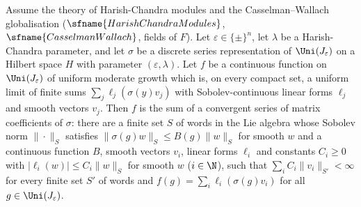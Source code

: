 \begin{theorem}\label{pf:rowprops:closure}
Assume the theory of Harish-Chandra modules and the Casselman--Wallach globalisation ($\sfname{HarishChandraModules}$,
$\sfname{CasselmanWallach}$, fields of $F$). Let $\varepsilon\in\{\pm\}^n$, let $\lambda$ be a Harish-Chandra parameter, and let
$\sigma$ be a discrete series representation of $\Uni(J_\varepsilon)$ on a Hilbert space $H$ with parameter $(\varepsilon,\lambda)$.
Let $f$ be a continuous function on $\Uni(J_\varepsilon)$ of uniform moderate growth which is, on every compact set, a uniform
limit of finite sums $\sum_j\ell_j(\sigma(y)v_j)$ with Sobolev-continuous linear forms $\ell_j$ and smooth vectors $v_j$. Then
$f$ is the sum of a convergent series of matrix coefficients of $\sigma$: there are a finite set $S$ of words in the Lie
algebra whose Sobolev norm $\|\cdot\|_S$ satisfies $\|\sigma(g)w\|_S\le B(g)\|w\|_S$ for smooth $w$ and a continuous function
$B$, smooth vectors $v_i$, linear forms $\ell_i$ and constants $C_i\ge0$ with $|\ell_i(w)|\le C_i\|w\|_S$ for smooth $w$
($i\in\N$), such that $\sum_iC_i\|v_i\|_{S'}<\infty$ for every finite set $S'$ of words and $f(g)=\sum_i\ell_i(\sigma(g)v_i)$
for all $g\in\Uni(J_\varepsilon)$.
\end{theorem}

